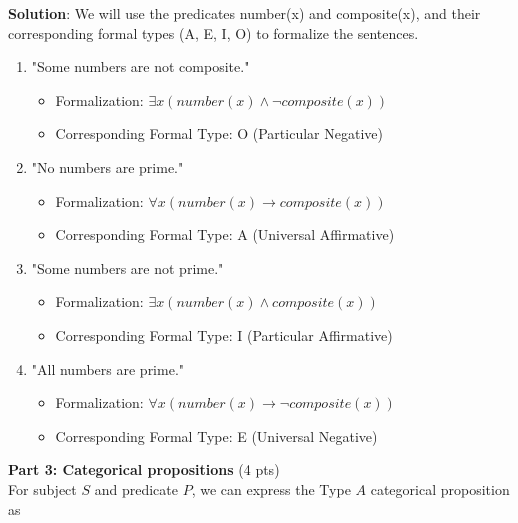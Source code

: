 \documentclass[12pt]{article}
\begin{document}
\begin{spacing}{1.5}
	\textbf{Solution}: We will use the predicates number(x) and composite(x), and their corresponding formal types (A, E, I, O) to formalize the sentences.
								
	\begin{enumerate}
		\item "Some numbers are not composite."

		      \begin{itemize}
		      	\item Formalization: $\exists x(number(x) \land \neg composite(x))$
		      	\item Corresponding Formal Type: O (Particular Negative)
		      \end{itemize}

		\item "No numbers are prime."

		      \begin{itemize}
		      	\item Formalization: $\forall x (number(x) \rightarrow composite(x))$
		      	\item Corresponding Formal Type: A (Universal Affirmative)
		      \end{itemize}

		\item "Some numbers are not prime."

		      \begin{itemize}
		      	\item Formalization: $\exists x(number(x) \land composite(x))$
		      	\item Corresponding Formal Type: I (Particular Affirmative)
		      \end{itemize}

		\item "All numbers are prime."

		      \begin{itemize}
		      	\item Formalization: $\forall x(number(x) \rightarrow \neg composite(x))$
		      	\item Corresponding Formal Type: E (Universal Negative) \\
		      \end{itemize}

	\end{enumerate}
							
	\noindent \textbf{Part 3: Categorical propositions} (4 pts)\\
	For subject $S$ and predicate $P$, we can express the Type $A$ categorical proposition as
							

\end{spacing}
\end{document}
